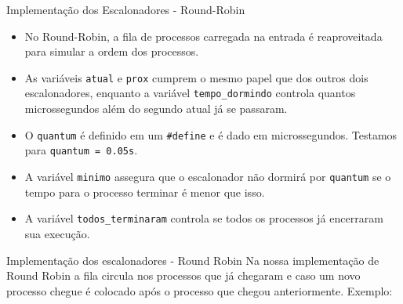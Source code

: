 \documentclass[10pt]{beamer}
\begin{document}
    \begin{frame}{Implementação dos Escalonadores - Round-Robin}
        \begin{itemize}
            \justifying
            \item No Round-Robin, a fila de processos carregada na entrada é reaproveitada para simular a ordem dos processos.

            \item As variáveis \texttt{atual} e \texttt{prox} cumprem o mesmo papel que dos outros dois escalonadores,
        enquanto a variável \texttt{tempo\_dormindo} controla quantos microssegundos além do segundo atual já se passaram.

            \item O \texttt{quantum} é definido em um \texttt{\#define} e é dado em microssegundos. Testamos para \texttt{quantum = 0.05s}.

            \item A variável \texttt{minimo} assegura que o escalonador não dormirá por \texttt{quantum} se o tempo para o processo terminar é menor que isso.

            \item A variável \texttt{todos\_terminaram} controla se todos os processos já encerraram sua execução.
        \end{itemize}
    \end{frame}
    \begin{frame}{Implementação dos escalonadores - Round Robin}
    Na nossa implementação de Round Robin a fila circula nos processos que já chegaram e caso um novo processo chegue é colocado após o processo que chegou anteriormente. Exemplo:
    \begin{figure}
    \end{figure}
    \begin{figure}
    \end{figure}    
    \end{frame}
\end{document}
